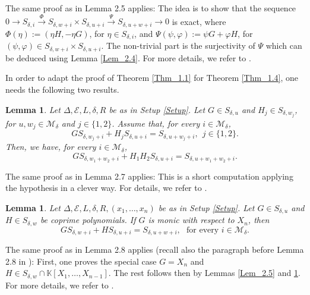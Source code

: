 \documentclass[11pt]{amsart}
\theoremstyle{plain}
\newtheorem{Lem}[Thm]{Lemma}
\theoremstyle{definition}
\numberwithin{equation}{section}
\renewcommand{\d}{\delta}
\newcommand{\D}{\Delta}
\newcommand{\KK}{{\mathbb K}}
\newcommand{\cE}{\mathcal{E}}
\newcommand{\cM}{\mathcal{M}}
\renewcommand{\(}{(\!(}
\renewcommand{\)}{)\!)}
\begin{document}
	\noindent 
	The same proof as in \cite{GH} Lemma 2.5 applies:
	The idea is to show that the sequence 
	$ 0 \to S_{\d,i} \stackrel{\Phi}{\to} S_{\d,w+i} \times  S_{\d,u+i} \stackrel{\Psi}{\to}  S_{\d,u+w+i} \to 0 $ 
	is exact,
	where $ \Phi (\eta) := (\eta H, - \eta G ) $, for $ \eta \in S_{\d,i} $,
	and $ \Psi(\psi, \varphi) := \psi G + \varphi H $, for $ (\psi, \varphi ) \in  S_{\d,w+i} \times  S_{\d,u+i} $.
	The non-trivial part is the surjectivity of $ \Psi $ which can be deduced using Lemma \ref{Lem_2.4}.
	For more details, we refer to \cite{GH}.
	
\smallskip



In order to adapt the proof of Theorem \ref{Thm_1.1} for Theorem \ref{Thm_1.4},
one needs the following two results.
	
\begin{Lem}
	\label{Lem_2.7}
	Let $  \D, \cE, L, \d, R $ be as in Setup \ref{Setup}.
	Let $ G \in S_{\d,u} $ and $ H_j \in S_{\d,w_j} $, for $ u, w_j \in \cM_\d $ and $ j \in \{ 1,2\} $.
	Assume that, for every $ i \in \cM_\d $,
	\[
		G S_{\d,w_j+i} + H_j S_{\d,u+i} = S_{\d,u+w_j+i},
		\ \ j \in \{1, 2 \}. 
	\]
	Then, we have, for every  $ i \in \cM_\d $,
	\[
	G S_{\d,w_1+w_2+i} + H_1 H_2 S_{\d,u+i} = S_{\d,u+w_1+w_2+i}. 
	\]
\end{Lem}

\noindent 
The same proof as in \cite{GH} Lemma 2.7 applies:
This is a short computation applying the hypothesis in a clever way. 
For details, we refer to \cite{GH}.
	
\begin{Lem}
	\label{Lem_2.8}
	Let $  \D, \cE, L, \d, R, (x_1, \ldots, x_n) $ be as in Setup \ref{Setup}.
	Let $ G \in S_{\d,u} $ and $ H \in S_{\d,w} $ be coprime polynomials.
	If $ G $ is monic with respect to $ X_n $, then
	\[
	G S_{\d,w+i} + H S_{\d,u+i} = S_{\d,u+w+i},
	\ \ \
	\mbox{for every } i \in \cM_\d. 
	\]
\end{Lem}

\noindent 
The same proof as in \cite{GH} Lemma 2.8 applies
(recall also the paragraph before Lemma 2.8 in \cite{GH}):
First, one proves the special case $ G = X_n $
and $ H \in S_{\d,w} \cap \KK[X_1, \ldots, X_{n-1}] $.
The rest follows then by Lemmas \ref{Lem_2.5} and \ref{Lem_2.7}.
For more details, we refer to \cite{GH}.
\end{document}
